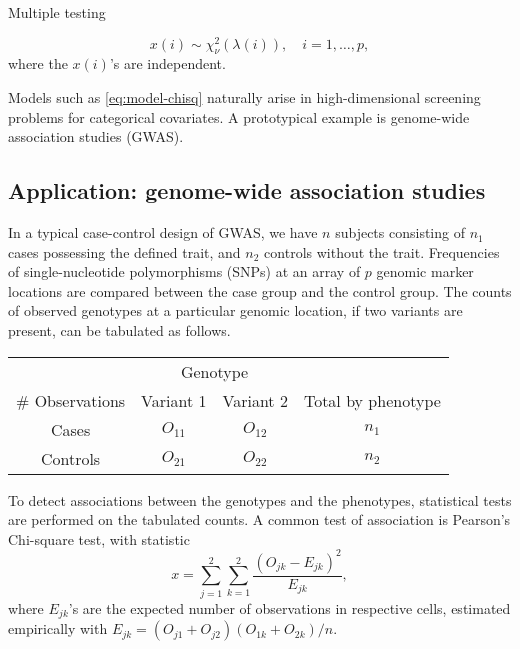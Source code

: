 
Multiple testing

\begin{equation} \label{eq:model-chisq}
    x(i) \sim \chi_\nu^2\left(\lambda(i)\right), \quad i=1,\ldots,p,
\end{equation}
where the $x(i)$'s are independent.

Models such as \eqref{eq:model-chisq} naturally arise in high-dimensional screening problems for categorical covariates.
A prototypical example is genome-wide association studies (GWAS).

\subsection{Application: genome-wide association studies}
\label{subsec:motivation}

In a typical case-control design of GWAS, we have $n$ subjects consisting of $n_1$ cases possessing the defined trait, and $n_2$ controls without the trait.
Frequencies of single-nucleotide polymorphisms (SNPs) at an array of $p$ genomic marker locations are compared between the case group and the control group.
The counts of observed genotypes at a particular genomic location, if two variants are present, can be tabulated as follows.
\begin{center}
    \begin{tabular}{cccc}
    \hline
    & \multicolumn{2}{c}{Genotype} & \\
    \cline{2-3}
    \# Observations & Variant 1 & Variant 2 & Total by phenotype \\
    \hline
    Cases & $O_{11}$ & $O_{12}$ & $n_1$ \\
    Controls & $O_{21}$ & $O_{22}$ & $n_2$ \\
    \hline
    \end{tabular}
\end{center}
To detect associations between the genotypes and the phenotypes, statistical tests are performed on the tabulated counts.
A common test of association is Pearson's Chi-square test, with statistic
\begin{equation} \label{eq:chisq-statistic}
    x = \sum_{j=1}^2 \sum_{k=1}^2 \frac{(O_{jk} - E_{jk})^2}{E_{jk}},
\end{equation}
where $E_{jk}$'s are the expected number of observations in respective cells, estimated empirically with $E_{jk} = (O_{j1}+O_{j2})(O_{1k}+O_{2k})/n$.

